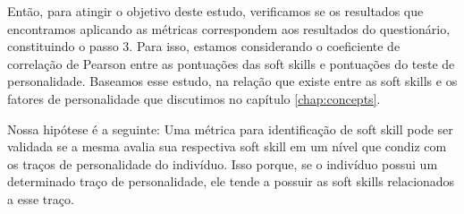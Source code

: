 Então, para atingir o objetivo deste estudo, verificamos se os resultados que encontramos aplicando as métricas correspondem aos resultados do questionário, constituindo o passo 3.
Para isso, estamos considerando o coeficiente de correlação de Pearson entre as pontuações das soft skills e pontuações do teste de personalidade.
Baseamos esse estudo, na relação que existe entre as soft skills e os fatores de personalidade que discutimos no capítulo \ref{chap:concepts}.

Nossa hipótese é a seguinte: Uma métrica para identificação de soft skill pode ser validada se a mesma avalia sua respectiva soft skill em um nível que condiz com os traços de personalidade do indivíduo. Isso porque, se o indivíduo possui um determinado traço de personalidade, ele tende a possuir as soft skills relacionados a esse traço.

